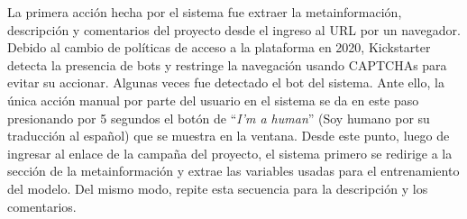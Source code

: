 La primera acción hecha por el sistema fue extraer la metainformación, descripción y comentarios del proyecto desde el ingreso al URL por un navegador. Debido al cambio de políticas de acceso a la plataforma en 2020, Kickstarter detecta la presencia de bots y restringe la navegación usando CAPTCHAs para evitar su accionar. Algunas veces fue detectado el bot del sistema. Ante ello, la única acción manual por parte del usuario en el sistema se da en este paso presionando por 5 segundos el botón de “\textit{I'm a human}” (Soy humano por su traducción al español) que se muestra en la ventana. Desde este punto, luego de ingresar al enlace de la campaña del proyecto, el sistema primero se redirige a la sección de la metainformación y extrae las variables usadas para el entrenamiento del modelo. Del mismo modo, repite esta secuencia para la descripción y los comentarios.

